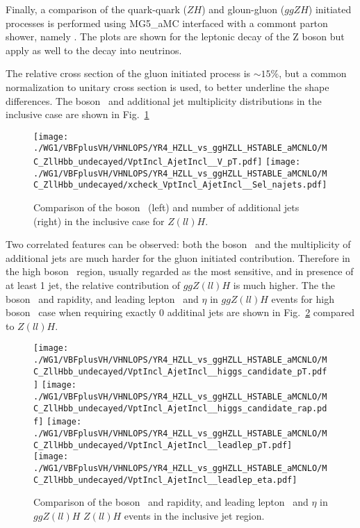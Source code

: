 Finally, a comparison of the quark-quark ($ZH$) and gloun-gluon ($ggZH$) initiated processes is performed using
{\sc MG5\_aMC} interfaced with a commont parton shower, namely . The plots are shown for the leptonic decay of the Z boson
but apply as well to the decay into neutrinos.

The relative cross section of the gluon initiated process is $\sim15\%$, but a common normalization to unitary cross section is used,
to better underline the shape differences.
The boson \pt\ and additional jet multiplicity distributions in the inclusive case are shown in Fig.~\ref{fig:stable__incl_vpt_jets_ggzh}
\begin{figure}[hptb]
\centering
\texttt{[image: ./WG1/VBFplusVH/VHNLOPS/YR4\_HZLL\_vs\_ggHZLL\_HSTABLE\_aMCNLO/MC\_ZllHbb\_undecayed/VptIncl\_AjetIncl\_\_V\_pT.pdf]}
\texttt{[image: ./WG1/VBFplusVH/VHNLOPS/YR4\_HZLL\_vs\_ggHZLL\_HSTABLE\_aMCNLO/MC\_ZllHbb\_undecayed/xcheck\_VptIncl\_AjetIncl\_\_Sel\_najets.pdf]}
\caption{Comparison of the boson \pt\ (left) and number of additional jets (right) in the inclusive case for $Z(ll)H$.}
\label{fig:stable__incl_vpt_jets_ggzh}
\end{figure}
Two correlated features can be observed: both the boson \pt\ and the multiplicity of additional jets are much harder for the gluon initiated contribution.
Therefore in the high boson \pt\ region, usually regarded as the most sensitive, and in presence of at least 1 jet, the relative contribution of $ggZ(ll)H$
is much higher.
The the boson \pt\ and rapidity, and leading lepton \pt\ and $\eta$ in $ggZ(ll)H$ events
for high boson \pt\ case when requiring exactly 0 additinal jets are shown in Fig.~\ref{fig:stable__incl_vpt_jets_ggzh2} compared to $Z(ll)H$.
%
\begin{figure}[hptb]
\centering
\texttt{[image: ./WG1/VBFplusVH/VHNLOPS/YR4\_HZLL\_vs\_ggHZLL\_HSTABLE\_aMCNLO/MC\_ZllHbb\_undecayed/VptIncl\_AjetIncl\_\_higgs\_candidate\_pT.pdf]}
\texttt{[image: ./WG1/VBFplusVH/VHNLOPS/YR4\_HZLL\_vs\_ggHZLL\_HSTABLE\_aMCNLO/MC\_ZllHbb\_undecayed/VptIncl\_AjetIncl\_\_higgs\_candidate\_rap.pdf]}
\texttt{[image: ./WG1/VBFplusVH/VHNLOPS/YR4\_HZLL\_vs\_ggHZLL\_HSTABLE\_aMCNLO/MC\_ZllHbb\_undecayed/VptIncl\_AjetIncl\_\_leadlep\_pT.pdf]}
\texttt{[image: ./WG1/VBFplusVH/VHNLOPS/YR4\_HZLL\_vs\_ggHZLL\_HSTABLE\_aMCNLO/MC\_ZllHbb\_undecayed/VptIncl\_AjetIncl\_\_leadlep\_eta.pdf]}
\caption{Comparison of the boson \pt\ and rapidity, and leading lepton \pt\ and $\eta$ in $ggZ(ll)H$ $Z(ll)H$ events in the inclusive jet region.}
\label{fig:stable__incl_vpt_jets_ggzh2}
\end{figure}

